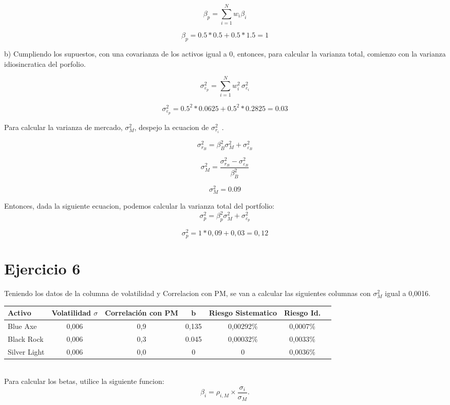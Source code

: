 \documentclass{article}
\begin{document}
\[
\beta_p = \sum_{i=1}^{N} w_i \beta_i
\]

\[
\beta_p = 0.5*0.5 + 0.5*1.5 = 1
\]

b) Cumpliendo los supuestos, con una covarianza de los activos igual a 0, entonces, para calcular la varianza total, comienzo con
la varianza idiosincratica del porfolio.

\[
\sigma^2_{\varepsilon_p} = \sum_{i=1}^{N} w_i^2 \, \sigma^2_{\varepsilon_i}
\]

\[
\sigma^2_{\varepsilon_p} = 0.5^2*0.0625 + 0.5^2*0.2825 = 0.03
\]


Para calcular la varianza de mercado, $\sigma_M^2$, despejo la ecuacion de $\sigma^2_{r_i}$ .


\[
\sigma^2_{r_B} = \beta_B^2 \sigma_M^2 + \sigma^2_{\varepsilon_B}
\]

\[
\sigma_M^2 = \frac{\sigma^2_{r_B} - \sigma^2_{\varepsilon_B} } { \beta_B^2}
\]

\[
\sigma_M^2 = 0.09
\]

Entonces, dada la siguiente ecuacion, podemos calcular la varianza total del portfolio:
\[
\sigma_p^2 = \beta_p^2 \sigma_M^2 + \sigma^2_{\varepsilon_p}
\]

\[
\sigma_p^2 = 1 * 0,09 + 0,03 = 0,12
\]


\section{Ejercicio 6}

Teniendo los datos de la columna de volatilidad y Correlacion con PM, se van a calcular las siguientes columnas
 con $\sigma_M^2$ igual a 0,0016.
\\

\begin{tabular}{lcccccc}
\hline
\textbf{Activo} & \textbf{Volatilidad $\sigma$} & \textbf{Correlación con PM} & \(\mathbf{b}\) & \textbf{Riesgo Sistematico} & \textbf{Riesgo Id.} \\
\hline
Blue Axe     & 0,006 & 0,9 & 0,135 & 0,00292\%& 0,0007\% \\
Black Rock   & 0,006 & 0,3 & 0.045 & 0,00032\% & 0,0033\%\\
Silver Light & 0,006 & 0,0 & 0 & 0 & 0,0036\%\\
\hline
\end{tabular}
\\

Para calcular los betas, utilice la siguiente funcion:
\[
\beta_i = \rho_{i,M} \times \frac{\sigma_i}{\sigma_M}.
\]
\end{document}

